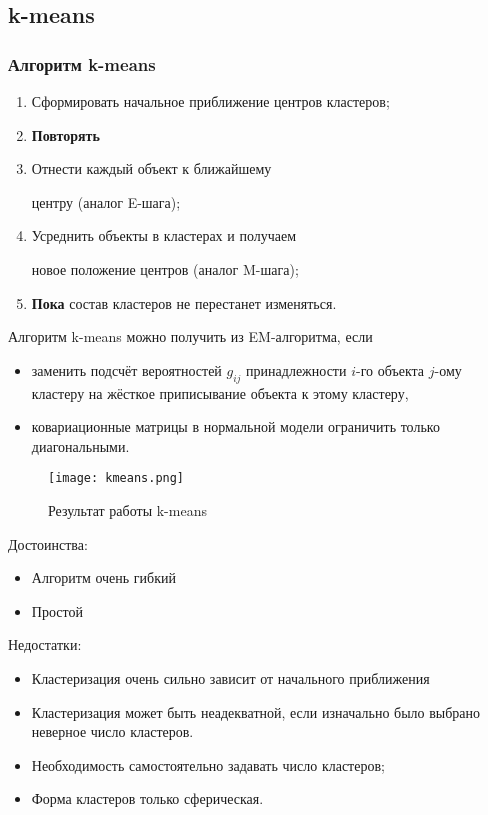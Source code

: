 \documentclass[12pt,pdf,notheorems]{beamer}
\begin{document}
\subsection[k-means]{k-means}
\begin{frame}\frametitle{Алгоритм k-means}
	\begin{enumerate}
	\item Сформировать начальное приближение центров кластеров;
	\item \textbf{Повторять}
	\item \quad  Отнести каждый объект к ближайшему 

		\quad центру (аналог E-шага);
	\item \quad  Усреднить объекты в кластерах и получаем 

	        \quad новое положение центров (аналог M-шага);
	\item \textbf{Пока} состав кластеров не перестанет изменяться.
	\end{enumerate}
\end{frame}

\begin{frame}
	Алгоритм k-means можно получить из EM-алгоритма, если
	\begin{itemize}
		\item заменить подсчёт вероятностей $g_{ij}$ принадлежности $i$-го объекта $j$-ому кластеру на жёсткое приписывание объекта к этому кластеру,
		\item ковариационные матрицы в нормальной модели ограничить только диагональными.
	\end{itemize}
\end{frame}

\begin{frame}
	\begin{figure}
\centering
		\texttt{[image: kmeans.png]}
	\caption{Результат работы k-means}
	\end{figure}
\end{frame}

\begin{frame}
Достоинства:
	\begin{itemize}
	\item Алгоритм очень гибкий
	\item Простой
	\end{itemize}
Недостатки:
	\begin{itemize}
	\item Кластеризация очень сильно зависит от начального приближения
	\item Кластеризация может быть неадекватной, если изначально было выбрано неверное число кластеров.
	\item Необходимость самостоятельно задавать число кластеров;
	\item Форма кластеров только сферическая. 
	\end{itemize}
\end{frame}
\end{document}
